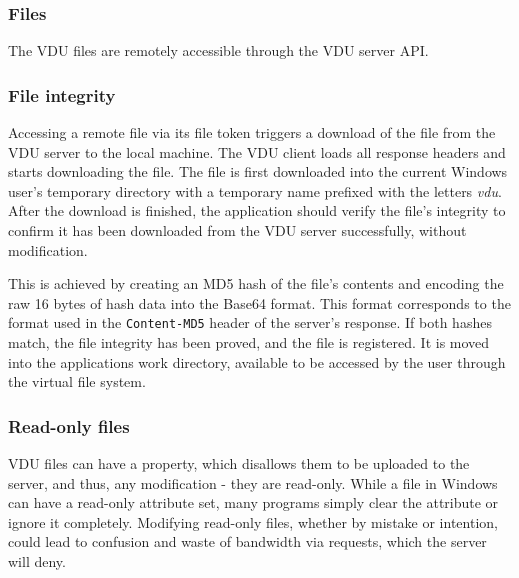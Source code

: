 \subsubsection{Files}
The VDU files are remotely accessible through the VDU server API.

\subsubsection{File integrity}
Accessing a remote file via its file token triggers a download of the file from the VDU server to the local machine. The VDU client loads all response headers and starts downloading the file. The file is first downloaded into the current Windows user's temporary directory with a temporary name prefixed with the letters \textit{vdu}. After the download is finished, the application should verify the file's integrity to confirm it has been downloaded from the VDU server successfully, without modification.

This is achieved by creating an MD5 hash of the file's contents and encoding the raw 16 bytes of hash data into the Base64 format. This format corresponds to the format used in the \lstinline{Content-MD5} header of the server's response. If both hashes match, the file integrity has been proved, and the file is registered. It is moved into the applications work directory, available to be accessed by the user through the virtual file system.

\subsubsection{Read-only files}
VDU files can have a property, which disallows them to be uploaded to the server, and thus, any modification - they are read-only. While a file in Windows can have a read-only attribute set, many programs simply clear the attribute or ignore it completely. Modifying read-only files, whether by mistake or intention, could lead to confusion and waste of bandwidth via requests, which the server will deny.

